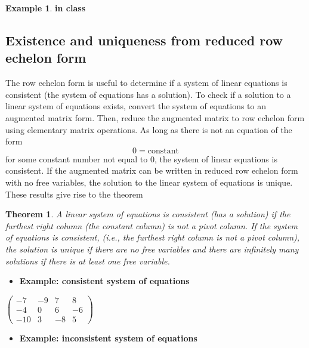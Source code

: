 \documentclass[
]{book}
\providecommand{\tightlist}{%
  \setlength{\itemsep}{0pt}\setlength{\parskip}{0pt}}
\newtheorem{theorem}{Theorem}[chapter]
\theoremstyle{definition}
\theoremstyle{definition}
\newtheorem{example}{Example}[chapter]
\theoremstyle{definition}
\theoremstyle{definition}
\theoremstyle{remark}
\begin{document}
\begin{example}
\textbf{in class}
\end{example}

\hypertarget{existence-and-uniqueness-from-reduced-row-echelon-form}{%
\subsection{Existence and uniqueness from reduced row echelon form}\label{existence-and-uniqueness-from-reduced-row-echelon-form}}

The row echelon form is useful to determine if a system of linear equations is consistent (the system of equations has a solution). To check if a solution to a linear system of equations exists, convert the system of equations to an augmented matrix form. Then, reduce the augmented matrix to row echelon form using elementary matrix operations. As long as there is not an equation of the form
\[
0 = \mbox{constant}
\]
for some constant number not equal to 0, the system of linear equations is consistent. If the augmented matrix can be written in reduced row echelon form with no free variables, the solution to the linear system of equations is unique. These results give rise to the theorem

\begin{theorem}
A linear system of equations is consistent (has a solution) if the furthest right column (the constant column) is not a pivot column. If the system of equations is consistent, (i.e., the furthest right column is not a pivot column), the solution is unique if there are no free variables and there are infinitely many solutions if there is at least one free variable.
\end{theorem}

\begin{itemize}
\tightlist
\item
  \textbf{Example: consistent system of equations}
\end{itemize}

\(\begin{pmatrix} -7 & -9 & 7 & 8 \\ -4 & 0 & 6 & -6 \\ -10 & 3 & -8 & 5 \end{pmatrix}\)

\begin{itemize}
\tightlist
\item
  \textbf{Example: inconsistent system of equations}
\end{itemize}
\end{document}
